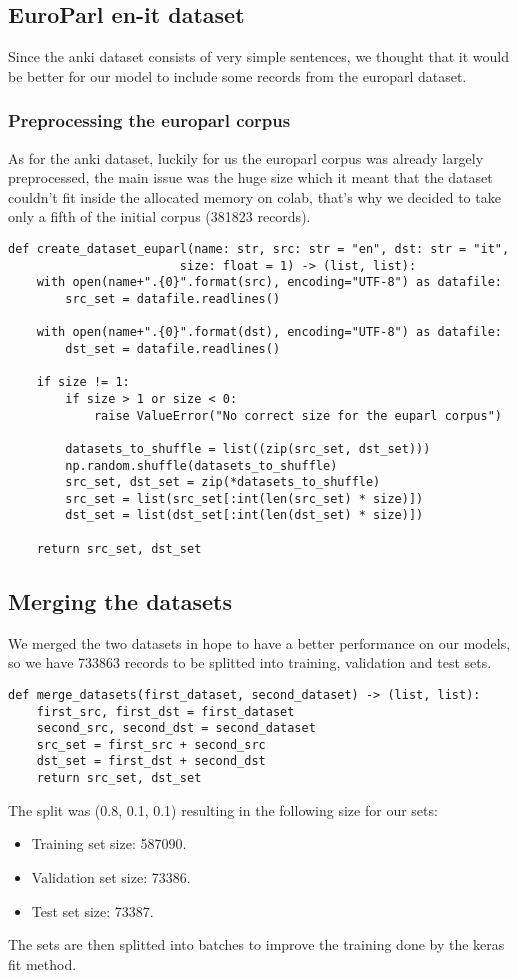 \subsection{EuroParl en-it dataset}
Since the anki dataset consists of very simple sentences, we thought that it would be better for our model to include some records from the europarl dataset.
\subsubsection{Preprocessing the europarl corpus}
As for the anki dataset, luckily for us the europarl corpus was already largely preprocessed, the main issue was the huge size which it meant that the dataset couldn't fit inside the allocated memory on colab, that's why we decided to take only a fifth of the initial corpus (381823 records).
\begin{verbatim}
def create_dataset_euparl(name: str, src: str = "en", dst: str = "it",
                        size: float = 1) -> (list, list):
    with open(name+".{0}".format(src), encoding="UTF-8") as datafile:
        src_set = datafile.readlines()

    with open(name+".{0}".format(dst), encoding="UTF-8") as datafile:
        dst_set = datafile.readlines()

    if size != 1:
        if size > 1 or size < 0:
            raise ValueError("No correct size for the euparl corpus")
        
        datasets_to_shuffle = list((zip(src_set, dst_set)))
        np.random.shuffle(datasets_to_shuffle)
        src_set, dst_set = zip(*datasets_to_shuffle)
        src_set = list(src_set[:int(len(src_set) * size)])
        dst_set = list(dst_set[:int(len(dst_set) * size)])
        
    return src_set, dst_set
\end{verbatim}
\subsection{Merging the datasets}
We merged the two datasets in hope to have a better performance on our models, so we have 733863 records to be splitted into training, validation and test sets.
\begin{verbatim}
def merge_datasets(first_dataset, second_dataset) -> (list, list):
    first_src, first_dst = first_dataset
    second_src, second_dst = second_dataset
    src_set = first_src + second_src
    dst_set = first_dst + second_dst
    return src_set, dst_set
\end{verbatim}
The split was (0.8, 0.1, 0.1) resulting in the following size for our sets:
\begin{itemize}
    \item Training set size: 587090.
    \item Validation set size: 73386.
    \item Test set size: 73387.
\end{itemize}
The sets are then splitted into batches to improve the training done by the keras fit method.
